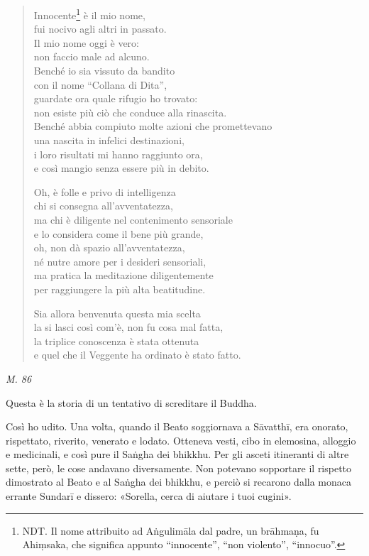 \begin{quote}
Innocente\footnote{NDT. Il nome attribuito ad Aṅgulimāla dal padre, un brāhmaṇa, fu Ahiṃsaka, che significa appunto “innocente”, “non violento”, “innocuo”.} è il mio nome, \\
fui nocivo agli altri in passato. \\
Il mio nome oggi è vero: \\
non faccio male ad alcuno. \\
Benché io sia vissuto da bandito \\
con il nome “Collana di Dita”, \\
guardate ora quale rifugio ho trovato: \\
non esiste più ciò che conduce alla rinascita. \\
Benché abbia compiuto molte azioni che promettevano \\
una nascita in infelici destinazioni, \\
i loro risultati mi hanno raggiunto ora, \\
e così mangio senza essere più in debito.


Oh, è folle e privo di intelligenza \\
chi si consegna all’avventatezza, \\
ma chi è diligente nel contenimento sensoriale \\
e lo considera come il bene più grande, \\
oh, non dà spazio all’avventatezza, \\
né nutre amore per i desideri sensoriali, \\
ma pratica la meditazione diligentemente \\
per raggiungere la più alta beatitudine.


Sia allora benvenuta questa mia scelta \\
la si lasci così com’è, non fu cosa mal fatta, \\
la triplice conoscenza è stata ottenuta \\
e quel che il Veggente ha ordinato è stato fatto.
\end{quote}

\emph{M. 86}


 Questa è la storia di un tentativo di screditare il
Buddha.


 Così ho udito. Una volta, quando il Beato soggiornava a
Sāvatthī, era onorato, rispettato, riverito, venerato e lodato. Otteneva
vesti, cibo in elemosina, alloggio e medicinali, e così pure il Saṅgha
dei bhikkhu. Per gli asceti itineranti di altre sette, però, le cose
andavano diversamente. Non potevano sopportare il rispetto dimostrato al
Beato e al Saṅgha dei bhikkhu, e perciò si recarono dalla monaca errante
Sundarī e dissero: «Sorella, cerca di aiutare i tuoi cugini».


